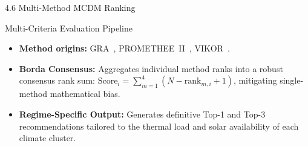 \documentclass[aspectratio=169, 11pt]{beamer}
\begin{document}
\begin{frame}{4.6 Multi-Method MCDM Ranking}
\begin{block}{\scriptsize Multi-Criteria Evaluation Pipeline}
\begin{itemize}
    \item \textbf{Method origins:} GRA~\cite{Deng1982GreySystems}, PROMETHEE~II~\cite{BransMareschal2005PROMETHEE}, VIKOR~\cite{OpricovicTzeng2004VIKOR}.
    \item \textbf{Borda Consensus:} Aggregates individual method ranks into a robust consensus rank sum: $\text{Score}_i = \sum_{m=1}^{4} (N - \text{rank}_{m,i} + 1)$, mitigating single-method mathematical bias.
    \item \textbf{Regime-Specific Output:} Generates definitive Top-1 and Top-3 recommendations tailored to the thermal load and solar availability of each climate cluster.
\end{itemize}
\end{block}
\end{frame}

\end{document}
